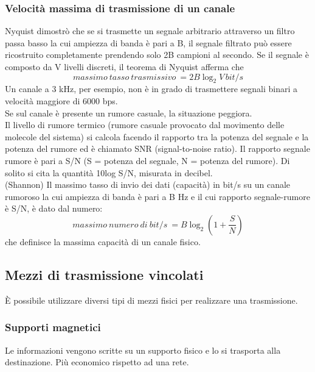 \documentclass{article}
\begin{document}
		\subsubsection{Velocità massima di trasmissione di un canale}
		Nyquist dimostrò che se si trasmette un segnale arbitrario attraverso un filtro passa basso la cui ampiezza di banda è pari a B, il segnale filtrato può essere ricostruito completamente prendendo solo 2B campioni al secondo. Se il segnale è composto da V livelli discreti, il teorema di Nyquist afferma che
		\begin{equation}
			massimo\: tasso\: trasmissivo\: = 2B \log_2{V} \, bit/s
		\end{equation}
		Un canale a 3 kHz, per esempio, non è in grado di trasmettere segnali binari a velocità maggiore di 6000 bps. \\
		Se sul canale è presente un rumore casuale, la situazione peggiora.\\
		Il livello di rumore termico (rumore casuale provocato dal movimento delle molecole del sistema) si calcola facendo il rapporto tra la potenza del segnale e la potenza del rumore ed è chiamato SNR (signal-to-noise ratio).
		Il rapporto segnale rumore è pari a S/N (S = potenza del segnale, N = potenza del rumore).
		Di solito si cita la quantità 10log S/N, misurata in decibel. \\
		(Shannon) Il massimo tasso di invio dei dati (capacità) in bit/s su un canale rumoroso la cui ampiezza di banda è pari a B Hz e il cui rapporto segnale-rumore è S/N, è dato dal numero:
		\begin{equation}
		massimo\: numero\: di\: bit/s\: = B \log_2(1+\frac{S}{N})
		\end{equation}
		che definisce la massima capacità di un canale fisico. 
		\subsection{Mezzi di trasmissione vincolati}
		È possibile utilizzare diversi tipi di mezzi fisici per realizzare una trasmissione.
		\subsubsection{Supporti magnetici}
		Le informazioni vengono scritte su un supporto fisico e lo si trasporta alla destinazione. Più economico rispetto ad una rete.
\end{document}

